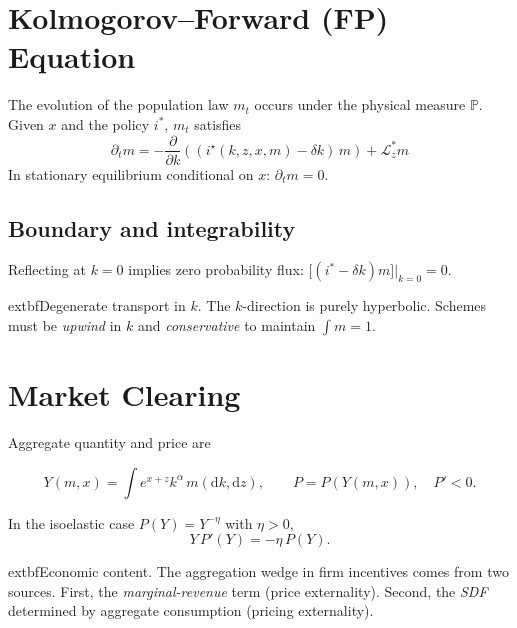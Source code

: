 \documentclass[11pt,letterpaper,oneside]{article}
\newcommand{\diff}{\mathrm{d}}
\newcommand{\Lzadj}{\mathcal{L}_z^{*}}
\begin{document}
\section{Kolmogorov--Forward (FP) Equation}

The evolution of the population law $m_t$ occurs under the physical measure $\mathbb{P}$. Given $x$ and the policy $i^*$, $m_t$ satisfies
\begin{equation}
\partial_t m = -\frac{\partial}{\partial k}\left((i^\star(k,z,x,m)-\delta k)\, m\right) + \Lzadj m
\tag{FP}\label{eq:FP}
\end{equation}
In stationary equilibrium conditional on $x$: $\partial_t m=0$.

\subsection{Boundary and integrability}
Reflecting at $k=0$ implies zero probability flux:
$\big[(i^*-\delta k)m\big]\big|_{k=0}=0$.

\begin{tcolorbox}[mathstyle]
      extbf{Degenerate transport in $k$.} The $k$-direction is purely hyperbolic. Schemes must be \emph{upwind} in $k$ and \emph{conservative} to maintain $\int m=1$.
\end{tcolorbox}

\section{Market Clearing}
Aggregate quantity and price are

$$
Y(m,x)=\int e^{x+z}k^\alpha\,m(\diff k,\diff z),\qquad P=P(Y(m,x)),\quad P'<0.
$$

In the isoelastic case $P(Y)=Y^{-\eta}$ with $\eta>0$,
\begin{equation}\label{eq:isoelastic}
Y\,P'(Y) = -\eta\, P(Y).
\end{equation}

\begin{tcolorbox}[didacticstyle]
      extbf{Economic content.} The aggregation wedge in firm incentives comes from two sources. First, the \emph{marginal-revenue} term (price externality). Second, the \emph{SDF} determined by aggregate consumption (pricing externality).
\end{tcolorbox}

\end{document}
